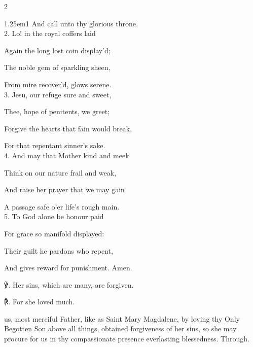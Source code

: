 \begin{paracol}{2}


\begin{hangparas}{1.25em}{1}
And call unto thy glorious throne.\\

2. Lo! in the royal coffers laid

Again the long lost coin display'd;

The noble gem of sparkling sheen,

From mire recover'd, glows serene.\\

3. Jesu, our refuge sure and sweet,

Thee, hope of penitents, we greet;

Forgive the hearts that fain would break,

For that repentant sinner's sake.\\

4. And may that Mother kind and meek

Think on our nature frail and weak,

And raise her prayer that we may gain

A passage safe o'er life's rough main.\\

5. To God alone be honour paid

For grace so manifold displayed:

Their guilt he pardons who repent,

And gives reward for punishment. Amen.\\
\end{hangparas}

℣. Her sins, which are many, are forgiven.

℟. For she loved much.


\collect
{} us, most merciful Father, like as Saint Mary Magdalene, by loving thy Only Begotten Son above all things, obtained forgiveness of her sins, so she may procure for us in thy compassionate presence everlasting blessedness. Through.

\fussy	
\end{paracol}



